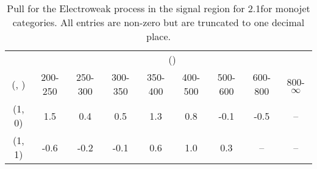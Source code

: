 \begin{table}[h!]
\tiny
\centering
\caption{Pull for the Electroweak process in the signal region for 2.1\ifb for monojet categories. All entries are non-zero but are truncated to one decimal place.\label{tab:pullsep_sig_ewk_mono}}
\begin{tabular}
{ccccccccc}
	\hline\hline
	& \multicolumn{8}{c}{\scalht (\gev)} \\ 
	 (\njet,  \nb) & 200-250 & 250-300 & 300-350 & 350-400 & 400-500 & 500-600 & 600-800 & 800-$\infty$ \\ [0.8ex] 
\hline
	(1, 0) & 1.5 & 0.4 & 0.5 & 1.3 & 0.8 & -0.1 & -0.5 & -- \\[0.5ex] 
	(1, 1) & -0.6 & -0.2 & -0.1 & 0.6 & 1.0 & 0.3 & -- & -- \\[0.5ex] 
	\hline
	\hline
\end{tabular}
\end{table}
